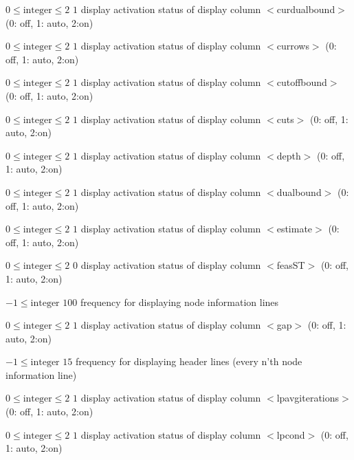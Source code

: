 %
{$0\leq\textrm{integer}\leq2$}%
{$1$}%
{display activation status of display column $<$curdualbound$>$ (0: off, 1: auto, 2:on)}%
{}

%
{$0\leq\textrm{integer}\leq2$}%
{$1$}%
{display activation status of display column $<$currows$>$ (0: off, 1: auto, 2:on)}%
{}

%
{$0\leq\textrm{integer}\leq2$}%
{$1$}%
{display activation status of display column $<$cutoffbound$>$ (0: off, 1: auto, 2:on)}%
{}

%
{$0\leq\textrm{integer}\leq2$}%
{$1$}%
{display activation status of display column $<$cuts$>$ (0: off, 1: auto, 2:on)}%
{}

%
{$0\leq\textrm{integer}\leq2$}%
{$1$}%
{display activation status of display column $<$depth$>$ (0: off, 1: auto, 2:on)}%
{}

%
{$0\leq\textrm{integer}\leq2$}%
{$1$}%
{display activation status of display column $<$dualbound$>$ (0: off, 1: auto, 2:on)}%
{}

%
{$0\leq\textrm{integer}\leq2$}%
{$1$}%
{display activation status of display column $<$estimate$>$ (0: off, 1: auto, 2:on)}%
{}

%
{$0\leq\textrm{integer}\leq2$}%
{$0$}%
{display activation status of display column $<$feasST$>$ (0: off, 1: auto, 2:on)}%
{}

%
{$-1\leq\textrm{integer}$}%
{$100$}%
{frequency for displaying node information lines}%
{}

%
{$0\leq\textrm{integer}\leq2$}%
{$1$}%
{display activation status of display column $<$gap$>$ (0: off, 1: auto, 2:on)}%
{}

%
{$-1\leq\textrm{integer}$}%
{$15$}%
{frequency for displaying header lines (every n'th node information line)}%
{}

%
{$0\leq\textrm{integer}\leq2$}%
{$1$}%
{display activation status of display column $<$lpavgiterations$>$ (0: off, 1: auto, 2:on)}%
{}

%
{$0\leq\textrm{integer}\leq2$}%
{$1$}%
{display activation status of display column $<$lpcond$>$ (0: off, 1: auto, 2:on)}%
{}

